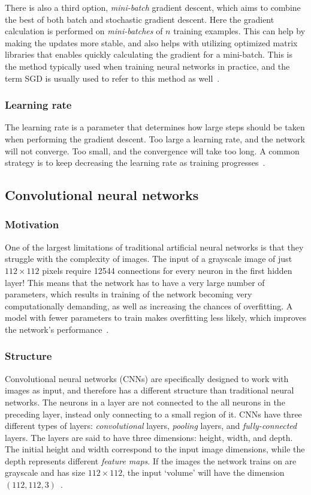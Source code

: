 \documentclass{kththesis}
\begin{document}
There is also a third option, \textit{mini-batch} gradient descent, which aims to combine the best of both batch and stochastic gradient descent. Here the gradient calculation is performed on \textit{mini-batches} of $n$ training examples. This can help by making the updates more stable, and also helps with utilizing optimized matrix libraries that enables quickly calculating the gradient for a mini-batch. This is the method typically used when training neural networks in practice, and the term SGD is usually used to refer to this method as well~\cite{gradient_descent}.

\subsubsection{Learning rate}
The learning rate is a parameter that determines how large steps should be taken when performing the gradient descent. Too large a learning rate, and the network will not converge. Too small, and the convergence will take too long. A common strategy is to keep decreasing the learning rate as training progresses~\cite{Bottou2012}.

\subsection{Convolutional neural networks}

\subsubsection{Motivation}
One of the largest limitations of traditional artificial neural networks is that they struggle with the complexity of images. The input of a grayscale image of just $112 \times 112$ pixels require \num{12544} connections for every neuron in the first hidden layer! This means that the network has to have a very large number of parameters, which results in training of the network becoming very computationally demanding, as well as increasing the chances of overfitting. A model with fewer parameters to train makes overfitting less likely, which improves the network's performance~\cite{cnnIntro}.

\subsubsection{Structure}
Convolutional neural networks (CNNs) are specifically designed to work with images as input, and therefore has a different structure than traditional neural networks.
The neurons in a layer are not connected to the all neurons in the preceding layer, instead only connecting to a small region of it.
CNNs have three different types of layers: \textit{convolutional} layers, \textit{pooling} layers, and \textit{fully-connected} layers.
The layers are said to have three dimensions: height, width, and depth. The initial height and width correspond to the input image dimensions, while the depth represents different \textit{feature maps}.
If the images the network trains on are grayscale and has size $112 \times 112$, the input `volume' will have the dimension $(112, 112, 3)$~\cite{cnnIntro}.
\end{document}
